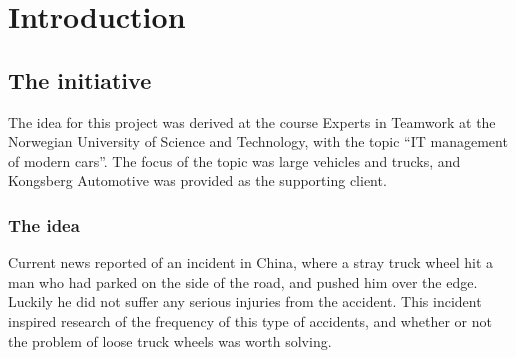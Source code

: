 \chapter{Introduction}
\section{The initiative}
The idea for this project was derived at the course Experts in Teamwork at the 
Norwegian University of Science and Technology, with the topic ``IT management 
of modern cars''. The focus of the topic was large vehicles and trucks, and 
Kongsberg Automotive was provided as the supporting client.

\subsection{The idea}
Current news reported of an incident in China, where a stray truck wheel hit a 
man who had parked on the side of the road, and pushed him over the edge. 
Luckily he did not suffer any serious injuries from the accident. This incident 
inspired research of the frequency of this type of accidents, and whether or 
not the problem of loose truck wheels was worth solving.